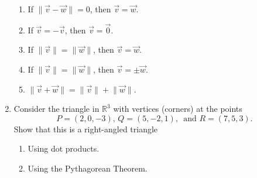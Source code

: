 \documentclass[letterpaper,12pt]{amsart}
\newcommand{\len}[1]{\lVert #1\rVert}
\newcommand{\R}{\mathbb{R}}
\begin{document}
\begin{enumerate}
\medskip

\begin{enumerate}
 \item If $\len{\vec{v}-\vec{w}}=0$, then $\vec{v}=\vec{w}$.
 \item If $\vec{v}=-\vec{v}$, then $\vec{v}=\vec{0}$.
 \item If $\len{\vec{v}}=\len{\vec{w}}$, then $\vec{v}=\vec{w}$.
 \item If $\len{\vec{v}}=\len{\vec{w}}$, then $\vec{v}=\pm\vec{w}$.
 \item $\len{\vec{v}+\vec{w}} = \len{\vec{v}}+\len{\vec{w}}$.
\end{enumerate}

\bigskip

\item Consider the triangle in $\R^3$ with vertices (corners) at the points 
\[
P=(2,0,-3),\, Q=(5,-2,1),\, \text{ and } R=(7,5,3). 
\]
 Show that this is a right-angled triangle

\medskip

\begin{enumerate}
 \item Using dot products.
 \item Using the Pythagorean Theorem.
\end{enumerate}
\end{enumerate}
\end{document}
